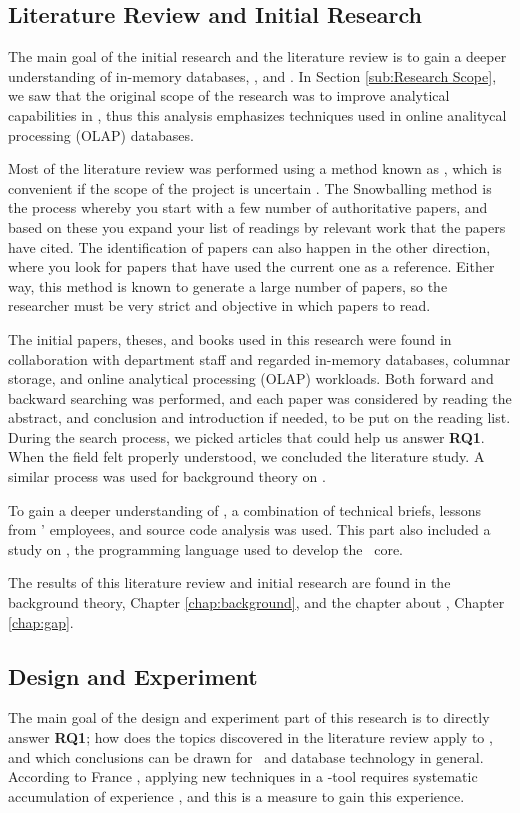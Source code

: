 \subsection{Literature Review and Initial Research}
\label{sub:Literature Review and Initial Research}
The main goal of the initial research and the literature review is to gain a deeper understanding of in-memory databases, \mde, and \gap. In Section \ref{sub:Research Scope}, we saw that the original scope of the research was to improve analytical capabilities in \gap, thus this analysis emphasizes techniques used in online analitycal processing (OLAP) databases. 

Most of the literature review was performed using a method known as , which is convenient if the scope of the project is uncertain \cite{Ang2014-nm}. The Snowballing method is the process whereby you start with a few number of authoritative papers, and based on these you expand your list of readings by relevant work that the papers have cited. The identification of papers can also happen in the other direction, where you look for papers that have used the current one as a reference. Either way, this method is known to generate a large number of papers, so the researcher must be very strict and objective in which papers to read.

The initial papers, theses, and books used in this research were found in collaboration with department staff and regarded in-memory databases, columnar storage, and online analytical processing (OLAP) workloads. Both forward and backward searching was performed, and each paper was considered by reading the abstract, and conclusion and introduction if needed, to be put on the reading list. During the search process, we picked articles that could help us answer \textbf{RQ1}. When the field felt properly understood, we concluded the  literature study. A similar process was used for background theory on \mde.

To gain a deeper understanding of \gap, a combination of technical briefs, lessons from \genus' employees, and source code analysis was used.  This part also included a study on \delphi, the programming language used to develop the \gap~core. 

The results of this literature review and initial research are found in the background theory, Chapter \ref{chap:background}, and the chapter about \gap, Chapter \ref{chap:gap}.

\subsection{Design and Experiment}
\label{sub:Design and Experiment}
The main goal of the design and experiment part of this research is to directly answer \textbf{RQ1}; how does the topics discovered in the literature review apply to \gap, and which conclusions can be drawn for \mde~and database technology in general. According to France \ea, applying new techniques in a \mdd-tool requires systematic accumulation of experience \cite{France2007-ae}, and this is a measure to gain this experience.

